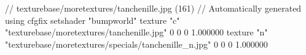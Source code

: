 // texturebase/moretextures/tanchenille.jpg (161)
// Automatically generated using cfgfix
setshader "bumpworld"
texture "c" "texturebase/moretextures/tanchenille.jpg" 0 0 0 1.000000
texture "n" "texturebase/moretextures/specials/tanchenille_n.jpg" 0 0 0 1.000000
